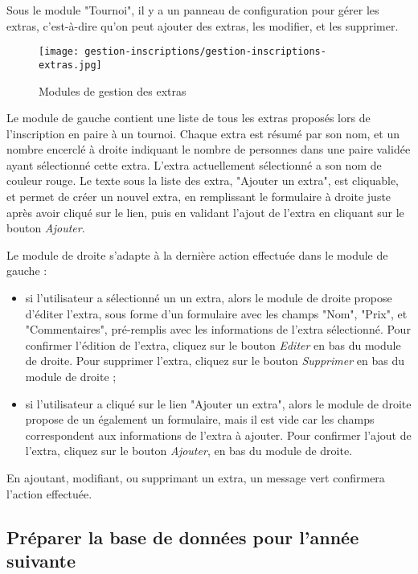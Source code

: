 Sous le module "Tournoi", il y a un panneau de configuration pour gérer les extras, c'est-à-dire qu'on peut ajouter des extras, les modifier, et les supprimer.

\begin{figure}[H]
\centering
\texttt{[image: gestion-inscriptions/gestion-inscriptions-extras.jpg]}
\caption{Modules de gestion des extras}
\end{figure}

Le module de gauche contient une liste de tous les extras proposés lors de l'inscription en paire à un tournoi. Chaque extra est résumé par son nom, et un nombre encerclé à droite indiquant le nombre de personnes dans une paire validée ayant sélectionné cette extra. L'extra actuellement sélectionné a son nom de couleur rouge. Le texte sous la liste des extra, "Ajouter un extra", est cliquable, et permet de créer un nouvel extra, en remplissant le formulaire à droite juste après avoir cliqué sur le lien, puis en validant l'ajout de l'extra en cliquant sur le bouton \textit{Ajouter}.\newline

Le module de droite s'adapte à la dernière action effectuée dans le module de gauche :

\begin{itemize}
\item si l'utilisateur a sélectionné un un extra, alors le module de droite propose d'éditer l'extra, sous forme d'un formulaire avec les champs "Nom", "Prix", et "Commentaires", pré-remplis avec les informations de l'extra sélectionné. Pour confirmer l'édition de l'extra, cliquez sur le bouton \textit{Editer} en bas du module de droite. Pour supprimer l'extra, cliquez sur le bouton \textit{Supprimer} en bas du module de droite ;
\item si l'utilisateur a cliqué sur le lien "Ajouter un extra", alors le module de droite propose de un également un formulaire, mais il est vide car les champs correspondent aux informations de l'extra à ajouter. Pour confirmer l'ajout de l'extra, cliquez sur le bouton \textit{Ajouter}, en bas du module de droite.
\end{itemize}
\bigskip

En ajoutant, modifiant, ou supprimant un extra, un message vert confirmera l'action effectuée.

\subsection{Préparer la base de données pour l'année suivante}

